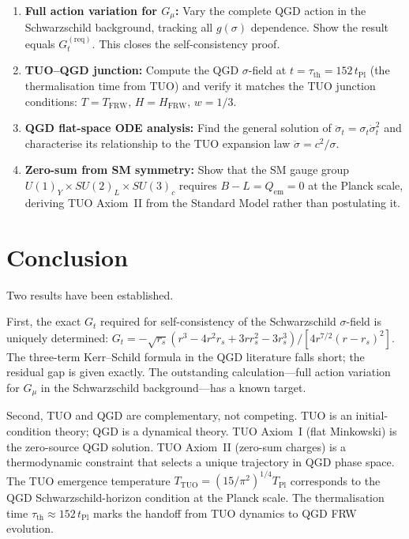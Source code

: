 \documentclass[11pt,a4paper]{article}
\theoremstyle{plain}
\theoremstyle{definition}
\theoremstyle{remark}
\newcommand{\rs}{r_s}
\newcommand{\TPl}{T_{\mathrm{Pl}}}
\newcommand{\TTUO}{T_{\mathrm{TUO}}}
\begin{document}
\begin{enumerate}
  \item \textbf{Full action variation for $G_\mu$:} Vary the complete QGD
    action in the Schwarzschild background, tracking all $g(\sigma)$
    dependence.  Show the result equals $G_t^{(\mathrm{req})}$.
    This closes the self-consistency proof.

  \item \textbf{TUO--QGD junction:} Compute the QGD $\sigma$-field at
    $t = \tau_\mathrm{th} = 152\,t_\mathrm{Pl}$ (the thermalisation time
    from TUO) and verify it matches the TUO junction conditions:
    $T = T_\mathrm{FRW}$, $H = H_\mathrm{FRW}$, $w = 1/3$.

  \item \textbf{QGD flat-space ODE analysis:} Find the general solution of
    $\ddot\sigma_t = \sigma_t\dot\sigma_t^2$ and characterise its
    relationship to the TUO expansion law $\ddot\sigma = c^2/\sigma$.

  \item \textbf{Zero-sum from SM symmetry:} Show that the SM gauge group
    $U(1)_Y \times SU(2)_L \times SU(3)_c$ requires $B-L = Q_\mathrm{em} = 0$
    at the Planck scale, deriving TUO Axiom~II from the Standard Model
    rather than postulating it.
\end{enumerate}

\section{Conclusion}

Two results have been established.

First, the exact $G_t$ required for self-consistency of the Schwarzschild
$\sigma$-field is uniquely determined: $G_t = -\sqrt{\rs}(r^3-4r^2\rs
+3r\rs^2-3\rs^3)/[4r^{7/2}(r-\rs)^2]$.  The three-term Kerr--Schild
formula in the QGD literature falls short; the residual gap is given
exactly.  The outstanding calculation---full action variation for $G_\mu$
in the Schwarzschild background---has a known target.

Second, TUO and QGD are complementary, not competing.  TUO is an
initial-condition theory; QGD is a dynamical theory.  TUO Axiom~I (flat
Minkowski) is the zero-source QGD solution.  TUO Axiom~II (zero-sum charges)
is a thermodynamic constraint that selects a unique trajectory in QGD
phase space.  The TUO emergence temperature $\TTUO = (15/\pi^2)^{1/4}\TPl$
corresponds to the QGD Schwarzschild-horizon condition at the Planck scale.
The thermalisation time $\tau_\mathrm{th} \approx 152\,t_\mathrm{Pl}$ marks
the handoff from TUO dynamics to QGD FRW evolution.
\end{document}
